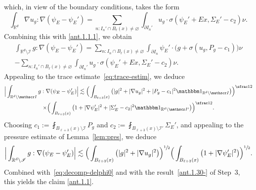 \documentclass[10pt]{amsart}
\let\mathcal\mathscr
\let\mathds\mathbbm
\theoremstyle{plain}
\theoremstyle{definition}
\newcommand{\R}{\mathbb R}
\newcommand{\Ic}{\mathcal I}
\begin{document}
which, in view of the boundary conditions, takes the form
\begin{equation*}
\int_{\R^d}\nabla u_g :\nabla(\psi_E-\psi_E')=
\sum_{n:I_n'\cap B_\ell(x)\ne\varnothing}\int_{\partial I_{n}'} u_g\cdot\sigma(\psi_E'+Ex,\Sigma_E'-c_2)\nu.
\end{equation*}
Combining this with \eqref{ant.1.1.1}, we obtain
\begin{multline*}
\int_{\R^d\setminus\Ic }g:\nabla(\psi_E-\psi_E')=
\sum_{n:I_n\cap B_\ell(x)\ne\varnothing}\int_{\partial I_n}\psi_E'\cdot\big(g+\sigma(u_g,P_g-c_1)\big)\nu\\
-\sum_{n:I_n'\cap B_\ell(x)\ne\varnothing}\int_{\partial I_{n}'} u_g \cdot\sigma(\psi_E'+Ex,\Sigma_E'-c_2)\nu.
\end{multline*}
Appealing to the trace estimate~\eqref{eq:trace-estim}, we deduce
\begin{multline*}
\Big|\int_{\R^d\setminus\Ic }g:\nabla(\psi_E-\psi_E')\Big|
\lesssim \Big(\int_{B_{\ell+3}(x)}\big(|g|^2+|\nabla u_g|^2+|P_g -c_1|^2\mathds1_{\R^d\setminus\Ic }\big)\Big)^{\sfrac12}\\
\times\Big(\int_{B_{\ell+3}(x)}\big(1+|\nabla\psi_E'|^2+|\Sigma_E'-c_2|^2\mathds1_{\R^d\setminus\Ic '}\big)\Big)^{\sfrac12}.
\end{multline*}
Choosing $c_1:=\fint_{B_{\ell+3}(x)\setminus\Ic }P_g$ and $c_2:=\fint_{B_{\ell+3}(x)\setminus\Ic' }\Sigma_E'$, and appealing to the pressure estimate of Lemma~\ref{lem:pres},
we deduce
\begin{equation*}\label{eq:preant1.1}
\Big|\int_{\R^d\setminus\Ic }g:\nabla(\psi_E-\psi_E')\Big|
\lesssim \Big(\int_{B_{\ell+3}(x)}\big(|g|^2+|\nabla u_g|^2\big)\Big)^{\sfrac12}
\Big(\int_{B_{\ell+3}(x)}\big(1+|\nabla\psi_E'|^2\big)\Big)^{\sfrac12}.
\end{equation*}
Combined with~\eqref{eq:decomp-delphi0} and with the result~\eqref{ant.1.30-} of Step~3, this yields the claim \eqref{ant.1.1}.
\end{document}
